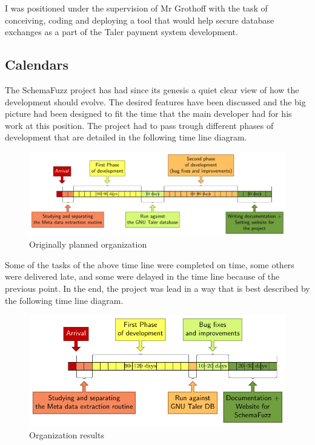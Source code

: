 I was positioned under the supervision of Mr Grothoff with the task of conceiving, coding and deploying a tool that would help secure database exchanges as a part of the Taler payment system development.  
	\subsection{Calendars}
	
The	SchemaFuzz project has had since its genesis a quiet clear view of how the development should evolve. The desired features have been discussed and the big picture had been designed to fit the time that the main developer had for his work at this position.
The project had to pass trough different phases of development that are detailed in the following time line diagram. 

		\bigskip
		\begin{figure} [h!]
			\includegraphics[width=\textwidth]{timelineDiagram.pdf}
			\caption{Originally planned organization}
		\end{figure}
		\bigskip


Some of the tasks of the above time line were completed on time, some others were delivered late, and some were delayed in the time line because of the previous point.
In the end, the project was lead in a way that is best described by the following time line diagram.

		\bigskip
		\begin{figure} [h!]
			\includegraphics[width=\textwidth]{timelineDiagram2.pdf}
			\caption{Organization results}
		\end{figure}
		\bigskip

